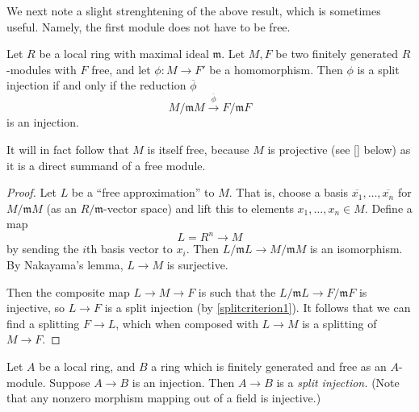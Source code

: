 We next note  a slight strenghtening of the above result, which is sometimes
useful. Namely, the first module does not have to be free.
\begin{proposition} 
Let $R$ be a local ring with maximal ideal $\mathfrak{m}$. Let $M, F$ be two
finitely generated $R$-modules with $F$ free, and let $\phi: M \to F'$ be a homomorphism. 
Then $\phi$ is a split injection if and only if the reduction $\overline{\phi}$
\[ M/\mathfrak{m}M \stackrel{\overline{\phi}}{\to} F/\mathfrak{m}F  \]
is an injection. 
\end{proposition}
It will in fact follow that $M$ is itself free, because $M$ is projective (see
\cref{} below) as it is a direct summand of a free module.
\begin{proof} 
Let $L$ be a ``free approximation'' to $M$.
That is, choose a basis $\overline{x_1}, \dots, \overline{x_n}$ for $M/\mathfrak{m}M$ (as an $R/\mathfrak{m}$-vector
space) and lift this to elements $x_1, \dots, x_n \in M$. Define a map
\[ L = R^n \to M  \]
by sending the $i$th basis vector to $x_i$.
Then $L/\mathfrak{m} L \to M/\mathfrak{m}M$ is an isomorphism.
By Nakayama's lemma,
$L \to M$ is surjective.

Then the composite map
$L \to M \to F$ is such that the $L/\mathfrak{m}L \to F/\mathfrak{m}F$ is injective, so
$L \to F$ is a split injection (by \cref{splitcriterion1}).
It follows that we can find a splitting $F \to L$, which when composed with $L
\to M$ is a splitting of $M \to F$.
\end{proof} 

\begin{exercise} 
Let $A$ be a local ring, and $B$ a ring which is finitely generated and free as an
$A$-module. Suppose $A \to B$ is an injection. Then $A \to B$ is a \emph{split
injection.} (Note that any nonzero morphism mapping out of a field is
injective.) 
\end{exercise} 

